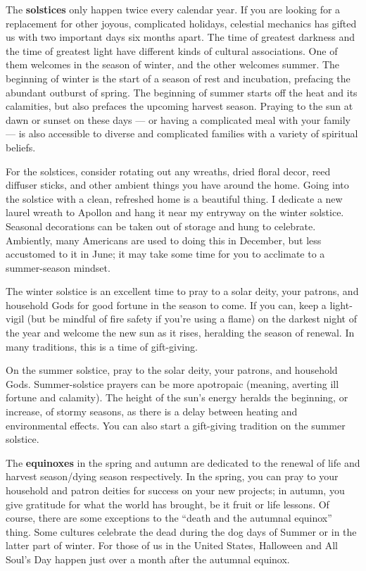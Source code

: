 \documentclass[
]{book}
\begin{document}
The \textbf{solstices} only happen twice every calendar year. If you are looking for a replacement for other joyous, complicated holidays, celestial mechanics has gifted us with two important days six months apart. The time of greatest darkness and the time of greatest light have different kinds of cultural associations. One of them welcomes in the season of winter, and the other welcomes summer. The beginning of winter is the start of a season of rest and incubation, prefacing the abundant outburst of spring. The beginning of summer starts off the heat and its calamities, but also prefaces the upcoming harvest season. Praying to the sun at dawn or sunset on these days --- or having a complicated meal with your family --- is also accessible to diverse and complicated families with a variety of spiritual beliefs.

For the solstices, consider rotating out any wreaths, dried floral decor, reed diffuser sticks, and other ambient things you have around the home. Going into the solstice with a clean, refreshed home is a beautiful thing. I dedicate a new laurel wreath to Apollon and hang it near my entryway on the winter solstice. Seasonal decorations can be taken out of storage and hung to celebrate. Ambiently, many Americans are used to doing this in December, but less accustomed to it in June; it may take some time for you to acclimate to a summer-season mindset.

The winter solstice is an excellent time to pray to a solar deity, your patrons, and household Gods for good fortune in the season to come. If you can, keep a light-vigil (but be mindful of fire safety if you're using a flame) on the darkest night of the year and welcome the new sun as it rises, heralding the season of renewal. In many traditions, this is a time of gift-giving.

On the summer solstice, pray to the solar deity, your patrons, and household Gods. Summer-solstice prayers can be more apotropaic (meaning, averting ill fortune and calamity). The height of the sun's energy heralds the beginning, or increase, of stormy seasons, as there is a delay between heating and environmental effects. You can also start a gift-giving tradition on the summer solstice.

The \textbf{equinoxes} in the spring and autumn are dedicated to the renewal of life and harvest season/dying season respectively. In the spring, you can pray to your household and patron deities for success on your new projects; in autumn, you give gratitude for what the world has brought, be it fruit or life lessons. Of course, there are some exceptions to the ``death and the autumnal equinox'' thing. Some cultures celebrate the dead during the dog days of Summer or in the latter part of winter. For those of us in the United States, Halloween and All Soul's Day happen just over a month after the autumnal equinox.
\end{document}
